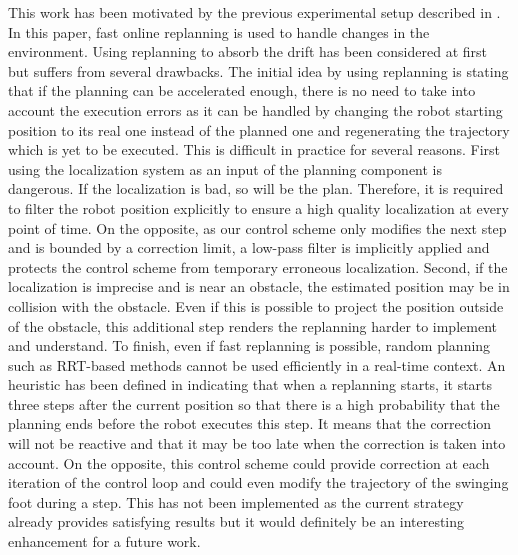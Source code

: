 This work has been motivated by the previous experimental setup
described in \cite{11humanoids.baudouin}. In this paper, fast online
replanning is used to handle changes in the environment. Using
replanning to absorb the drift has been considered at first but
suffers from several drawbacks. The initial idea by using replanning
is stating that if the planning can be accelerated enough, there is no
need to take into account the execution errors as it can be handled by
changing the robot starting position to its real one instead of the
planned one and regenerating the trajectory which is yet to be
executed. This is difficult in practice for several reasons. First
using the localization system as an input of the planning component is
dangerous. If the localization is bad, so will be the plan. Therefore,
it is required to filter the robot position explicitly to ensure a
high quality localization at every point of time. On the opposite, as
our control scheme only modifies the next step and is bounded by a
correction limit, a low-pass filter is implicitly applied and
protects the control scheme from temporary erroneous
localization. Second, if the localization is imprecise and is near an
obstacle, the estimated position may be in collision with the
obstacle. Even if this is possible to project the position outside of
the obstacle, this additional step renders the replanning harder to
implement and understand. To finish, even if fast replanning is
possible, random planning such as RRT-based methods cannot be used
efficiently in a real-time context. An heuristic has been defined in
\cite{11humanoids.baudouin} indicating that when a replanning starts,
it starts three steps after the current position so that there is a
high probability that the planning ends before the robot executes
this step. It means that the correction will not be reactive and that
it may be too late when the correction is taken into account.  On the
opposite, this control scheme could provide correction at each
iteration of the control loop and could even modify the trajectory of
the swinging foot during a step. This has not been implemented as the
current strategy already provides satisfying results but it would
definitely be an interesting enhancement for a future work.


\FloatBarrier

